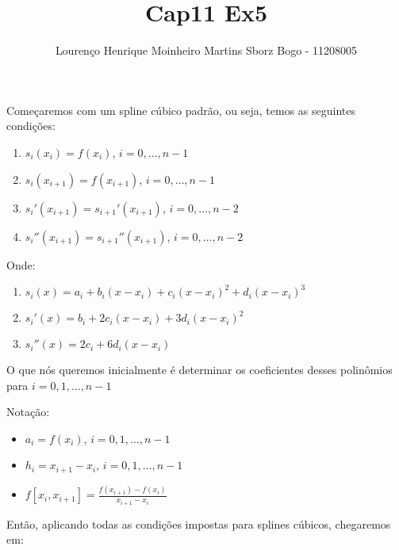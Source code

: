 \documentclass[12pt]{article}
\title{Cap11 Ex5}
\author{Lourenço Henrique Moinheiro Martins Sborz Bogo - 11208005}
\date{}
\begin{document}
\maketitle

Começaremos com um spline cúbico padrão, ou seja, temos as seguintes condições:

\begin{enumerate}
  
\item $s_i(x_i) = f(x_i)$, $i = 0,\dots,n-1$
  
\item $s_i(x_{i+1}) = f(x_{i+1})$, $i = 0,\dots,n-1$
  
\item $s_i'(x_{i+1}) = s_{i+1}'(x_{i+1})$, $i = 0,\dots,n-2$
  
\item $s_i''(x_{i+1}) = s_{i+1}''(x_{i+1})$, $i = 0,\dots,n-2$
  
\end{enumerate}

Onde:

\begin{enumerate}
  
\item $s_i(x) = a_i+b_i(x-x_i)+c_i{(x-x_i)}^2+d_i{(x-x_i)}^3$
  
\item $s_i'(x) = b_i+2c_i{(x-x_i)}+3d_i{(x-x_i)}^2$
  
\item $s_i''(x) = 2c_i+6d_i{(x-x_i)}$
  
\end{enumerate}

O que nós queremos inicialmente é determinar os coeficientes desses polinômios para $i = 0,1,\dots,n-1$

Notação:
\begin{itemize}

\item $a_i = f(x_i)$, $i = 0,1,\dots,n-1$  
  
\item $h_i = x_{i+1}-x_i$, $i = 0,1,\dots,n-1$
  
\item $f[x_i, x_{i+1}] = \frac{f(x_{i+1})-f(x_{i})}{x_{i+1}-x_i}$
  
\end{itemize}

Então, aplicando todas as condições impostas para splines cúbicos, chegaremos em:
\end{document}
